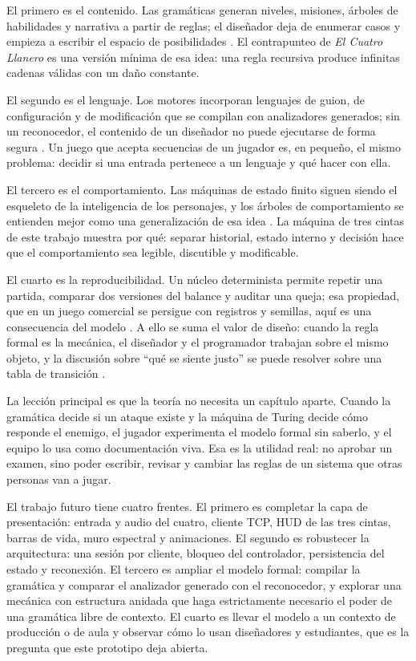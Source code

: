 \documentclass[9pt]{ieeeconf}
\begin{document}
El primero es el contenido. Las gramáticas generan niveles, misiones, árboles de habilidades y narrativa a partir de reglas; el diseñador deja de enumerar casos y empieza a escribir el espacio de posibilidades \cite{shaker2016}. El contrapunteo de \emph{El Cuatro Llanero} es una versión mínima de esa idea: una regla recursiva produce infinitas cadenas válidas con un daño constante.

El segundo es el lenguaje. Los motores incorporan lenguajes de guion, de configuración y de modificación que se compilan con analizadores generados; sin un reconocedor, el contenido de un diseñador no puede ejecutarse de forma segura \cite{gregory2018,nystrom2014,parr2013}. Un juego que acepta secuencias de un jugador es, en pequeño, el mismo problema: decidir si una entrada pertenece a un lenguaje y qué hacer con ella.

El tercero es el comportamiento. Las máquinas de estado finito siguen siendo el esqueleto de la inteligencia de los personajes, y los árboles de comportamiento se entienden mejor como una generalización de esa idea \cite{millington2019}. La máquina de tres cintas de este trabajo muestra por qué: separar historial, estado interno y decisión hace que el comportamiento sea legible, discutible y modificable.

El cuarto es la reproducibilidad. Un núcleo determinista permite repetir una partida, comparar dos versiones del balance y auditar una queja; esa propiedad, que en un juego comercial se persigue con registros y semillas, aquí es una consecuencia del modelo \cite{gregory2018}. A ello se suma el valor de diseño: cuando la regla formal es la mecánica, el diseñador y el programador trabajan sobre el mismo objeto, y la discusión sobre ``qué se siente justo'' se puede resolver sobre una tabla de transición \cite{salen2004,schell2019}.

La lección principal es que la teoría no necesita un capítulo aparte. Cuando la gramática decide si un ataque existe y la máquina de Turing decide cómo responde el enemigo, el jugador experimenta el modelo formal sin saberlo, y el equipo lo usa como documentación viva. Esa es la utilidad real: no aprobar un examen, sino poder escribir, revisar y cambiar las reglas de un sistema que otras personas van a jugar.

El trabajo futuro tiene cuatro frentes. El primero es completar la capa de presentación: entrada y audio del cuatro, cliente TCP, HUD de las tres cintas, barras de vida, muro espectral y animaciones. El segundo es robustecer la arquitectura: una sesión por cliente, bloqueo del controlador, persistencia del estado y reconexión. El tercero es ampliar el modelo formal: compilar la gramática y comparar el analizador generado con el reconocedor, y explorar una mecánica con estructura anidada que haga estrictamente necesario el poder de una gramática libre de contexto. El cuarto es llevar el modelo a un contexto de producción o de aula y observar cómo lo usan diseñadores y estudiantes, que es la pregunta que este prototipo deja abierta.
\end{document}
